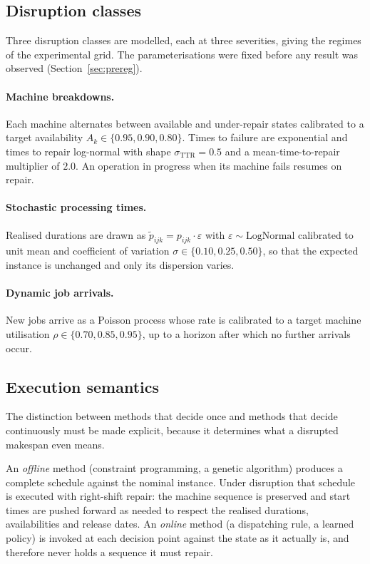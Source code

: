 \documentclass[a4paper,fleqn]{cas-sc}
\begin{document}
\subsection{Disruption classes}\label{sec:disruption}

Three disruption classes are modelled, each at three severities, giving the
\NRegimes{} regimes of the experimental grid. The parameterisations were fixed
before any result was observed (Section~\ref{sec:prereg}).

\paragraph{Machine breakdowns.} Each machine alternates between available and
under-repair states calibrated to a target availability
$A_k\in\{0.95,0.90,0.80\}$. Times to failure are exponential and times to repair
log-normal with shape $\sigma_{\text{TTR}}=0.5$ and a mean-time-to-repair
multiplier of $2.0$. An operation in progress when its machine fails resumes on
repair.

\paragraph{Stochastic processing times.} Realised durations are drawn as
$\tilde{p}_{ijk}=p_{ijk}\cdot\varepsilon$ with
$\varepsilon\sim\mathrm{LogNormal}$ calibrated to unit mean and coefficient of
variation $\sigma\in\{0.10,0.25,0.50\}$, so that the expected instance is
unchanged and only its dispersion varies.

\paragraph{Dynamic job arrivals.} New jobs arrive as a Poisson process whose
rate is calibrated to a target machine utilisation
$\rho\in\{0.70,0.85,0.95\}$, up to a horizon after which no further arrivals
occur.

\subsection{Execution semantics}\label{sec:execution}

The distinction between methods that decide once and methods that decide
continuously must be made explicit, because it determines what a disrupted
makespan even means.

An \emph{offline} method (constraint programming, a genetic algorithm) produces
a complete schedule against the nominal instance. Under disruption that schedule
is executed with right-shift repair: the machine sequence is preserved and start
times are pushed forward as needed to respect the realised durations,
availabilities and release dates. An \emph{online} method (a dispatching rule, a
learned policy) is invoked at each decision point against the state as it
actually is, and therefore never holds a sequence it must repair.
\end{document}
